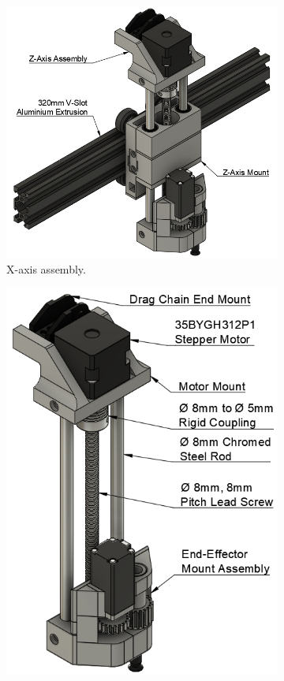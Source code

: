 \begin{figure}[!ht]
	\centering
	\begin{subfigure}{.6\textwidth}
		\centering
		\includegraphics[width=1\linewidth]{figures/x-axis-assembly.png}
		\caption{X-axis assembly.}
		\label{fig:x-axis-assembly}
	\end{subfigure}%
	\begin{subfigure}{.39\textwidth}
		\centering
		\includegraphics[width=1\linewidth]{figures/z-axis-assembly.png}

\end{subfigure}
\end{figure}
